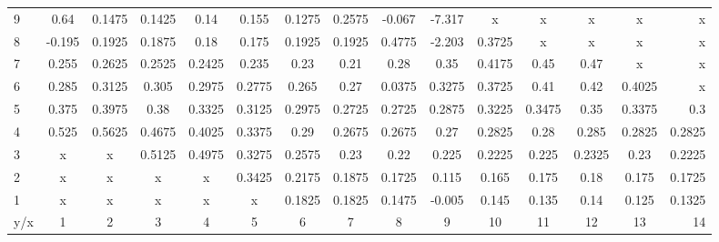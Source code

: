 \begin{tabular}{| l || c | c | c | c | c | c | c | c | c | c | c | c | c | r |}
\hline
9   &0.64	&0.1475	&0.1425	&0.14	&0.155	&0.1275	&0.2575	&-0.067	&-7.317	&x	    &x	    &x	    &x	    &x\\
8   &-0.195	&0.1925	&0.1875	&0.18	&0.175	&0.1925	&0.1925	&0.4775	&-2.203	&0.3725	&x	    &x	    &x	    &x\\
7   &0.255	&0.2625	&0.2525	&0.2425	&0.235	&0.23	&0.21	&0.28	&0.35	&0.4175	&0.45	&0.47	&x	    &x\\
6   &0.285	&0.3125	&0.305	&0.2975	&0.2775	&0.265	&0.27	&0.0375	&0.3275	&0.3725	&0.41	&0.42	&0.4025	&x\\
5   &0.375	&0.3975	&0.38	&0.3325	&0.3125	&0.2975	&0.2725	&0.2725	&0.2875	&0.3225	&0.3475	&0.35	&0.3375	&0.3\\
4   &0.525	&0.5625	&0.4675	&0.4025	&0.3375	&0.29	&0.2675	&0.2675	&0.27	&0.2825	&0.28	&0.285	&0.2825	&0.2825\\
3   &x	    &x	    &0.5125	&0.4975	&0.3275	&0.2575	&0.23	&0.22	&0.225	&0.2225	&0.225	&0.2325	&0.23	&0.2225\\
2   &x	    &x	    &x	    &x	    &0.3425	&0.2175	&0.1875	&0.1725	&0.115	&0.165	&0.175	&0.18	&0.175	&0.1725\\
1   &x	    &x	    &x	    &x	    &x	    &0.1825	&0.1825	&0.1475	&-0.005	&0.145	&0.135	&0.14	&0.125	&0.1325\\ \hline \hline
y/x &1	    &2	    &3	    &4	    &5	    &6	    &7	    &8	    &9	    &10	    &11	    &12	    &13	    &14\\ \hline
\end{tabular}